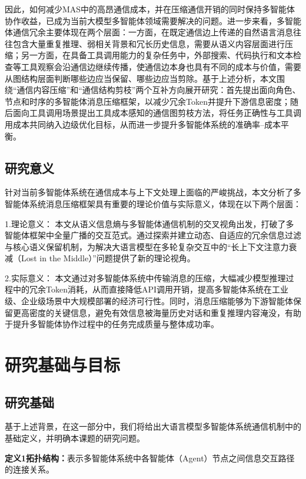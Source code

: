 因此，如何减少MAS中的高昂通信成本，并在压缩通信开销的同时保持多智能体协作收益，已成为当前大模型多智能体领域需要解决的问题。进一步来看，多智能体通信冗余主要体现在两个层面：一方面，在既定通信边上传递的自然语言消息往往包含大量重复推理、弱相关背景和冗长历史信息，需要从语义内容层面进行压缩\cite{ref54,ref56,ref57}；另一方面，在具备工具调用能力的复杂任务中，外部搜索、代码执行和文本检查等工具观察会沿通信边继续传播\cite{ref17,ref18,ref23}，使通信边本身也具有不同的成本与价值，需要从图结构层面判断哪些边应当保留、哪些边应当剪除\cite{ref40,ref43,ref48}。基于上述分析，本文围绕“通信内容压缩”和“通信结构剪枝”两个互补方向展开研究：首先提出面向角色、节点和时序的多智能体消息压缩框架，以减少冗余Token并提升下游信息密度；随后面向工具调用场景提出工具成本感知的通信图剪枝方法，将任务正确性与工具调用成本共同纳入边级优化目标，从而进一步提升多智能体系统的准确率--成本平衡。

\subsection{研究意义}
针对当前多智能体系统在通信成本与上下文处理上面临的严峻挑战，本文分析了多智能体系统消息压缩框架具有重要的理论价值与实际意义，体现在以下两个层面：

\par 1.理论意义：
本文从语义信息熵与多智能体通信机制的交叉视角出发，打破了多智能体框架中全量广播的交互范式。通过探索并建立动态、自适应的冗余信息过滤与核心语义保留机制，为解决大语言模型在多轮复杂交互中的“长上下文注意力衰减（Lost in the Middle）”问题提供了新的理论视角。
\par 2.实际意义：
本文通过对多智能体系统中传输消息的压缩，大幅减少模型推理过程中的冗余Token消耗，从而直接降低API调用开销，提高多智能体系统在工业级、企业级场景中大规模部署的经济可行性。同时，消息压缩能够为下游智能体保留更高密度的关键信息，避免有效信息被海量历史对话和重复推理内容淹没，有助于提升多智能体协作过程中的任务完成质量与整体成功率。

\section{研究基础与目标}
\subsection{研究基础}

基于上述背景，在这一部分中，我们将给出大语言模型多智能体系统通信机制中的基础定义，并明确本课题的研究问题。

\textbf{定义1拓扑结构：}表示多智能体系统中各智能体（Agent）节点之间信息交互路径的连接关系。

